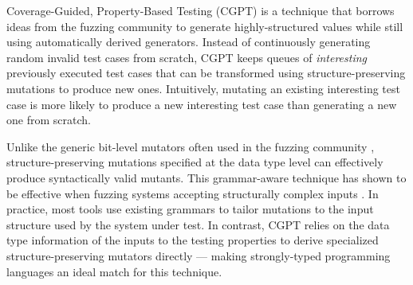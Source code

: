 \documentclass[sigconf,review,anonymous]{acmart}
\newcommand{\quickcheck}{\textit{QuickCheck}\xspace}
\newcommand{\quickchick}{\textit{QuickChick}\xspace}
\newcommand{\fuzzchick}{\textit{FuzzChick}\xspace}
\begin{document}
%
Coverage-Guided, Property-Based Testing (CGPT) \cite{lampropoulos2019coverage}
is a technique that borrows ideas from the fuzzing community to generate
highly-structured values while still using automatically derived generators.
%
%
Instead of continuously generating random invalid test cases from scratch, CGPT
keeps queues of \emph{interesting} previously executed test cases that can be
transformed using structure-preserving mutations to produce new ones.
%
%
Intuitively, mutating an existing interesting test case is more likely to
produce a new interesting test case than generating a new one from scratch.


Unlike the generic bit-level mutators often used in the fuzzing community
\cite{zzuf,radamsa}, structure-preserving mutations specified at the data type
level can effectively produce syntactically valid mutants. 
%
%
This grammar-aware technique has shown to be effective when fuzzing systems
accepting structurally complex inputs \cite{holler2012fuzzing, wang2019superion,
xsmith}.
%
In practice, most tools use existing grammars to tailor mutations to the input
structure used by the system under test. 
%
%
%
%
In contrast, CGPT relies on the data type information of the inputs to the
testing properties to derive specialized structure-preserving mutators directly
--- making strongly-typed programming languages an ideal match for this
technique.
%
%
%
%
\end{document}
